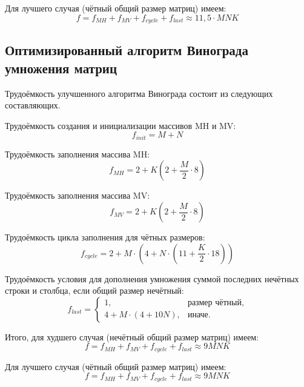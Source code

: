 Для лучшего случая (чётный общий размер матриц) имеем:
\begin{equation}
	\label{for:good}
	f =  f_{MH} + f_{MV} + f_{cycle} + f_{last} \approx 11,5 \cdot MNK
\end{equation}


\subsection{Оптимизированный алгоритм Винограда умножения матриц}

Трудоёмкость улучшенного алгоритма Винограда состоит из следующих составляющих.

Трудоёмкость создания и инициализации массивов MH и MV:
\begin{equation}
	\label{for:impr_init}
	f_{init} = M + N
\end{equation}

Трудоёмкость заполнения массива MH:
\begin{equation}
	\label{for:impr_MH}
	f_{MH} =  2 + K (2 + \frac{M}{2} \cdot 8)
\end{equation}

Трудоёмкость заполнения массива MV:
\begin{equation}
	\label{for:impr_MV}
	f_{MV} =  2 + K (2 + \frac{M}{2} \cdot 8)
\end{equation}

Трудоёмкость цикла заполнения для чётных размеров:
\begin{equation}
	\label{for:impr_cycle}
	f_{cycle} =2 + M \cdot (4 + N \cdot (11 + \frac{K}{2} \cdot 18))
\end{equation}

Трудоёмкость условия для дополнения умножения суммой последних нечётных строки и столбца, если общий размер нечётный:
\begin{equation}
	\label{for:impr_last}
	f_{last} = 
	\begin{cases}
		1, & \text{размер чётный,}\\
		4 + M \cdot (4 + 10N), & \text{иначе.}
	\end{cases}
\end{equation}

Итого, для худшего случая (нечётный общий размер матриц) имеем:
\begin{equation}
	\label{for:bad_impr}
	f = f_{MH} + f_{MV} + f_{cycle} + f_{last} \approx 9MNK
\end{equation}

Для лучшего случая (чётный общий размер матриц) имеем:
\begin{equation}
	\label{for:good_impr}
	f = f_{MH} + f_{MV} + f_{cycle} + f_{last} \approx 9MNK
\end{equation}

